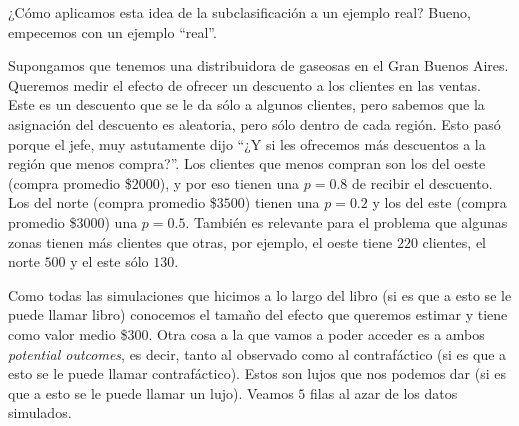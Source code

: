 \documentclass[
  letterpaper,
  DIV=11,
  numbers=noendperiod,
  oneside]{scrreprt}
\begin{document}
¿Cómo aplicamos esta idea de la subclasificación a un ejemplo real?
Bueno, empecemos con un ejemplo ``real''.

Supongamos que tenemos una distribuidora de gaseosas en el Gran Buenos
Aires. Queremos medir el efecto de ofrecer un descuento a los clientes
en las ventas. Este es un descuento que se le da sólo a algunos
clientes, pero sabemos que la asignación del descuento es aleatoria,
pero sólo dentro de cada región. Esto pasó porque el jefe, muy
astutamente dijo ``¿Y si les ofrecemos más descuentos a la región que
menos compra?''. Los clientes que menos compran son los del oeste
(compra promedio \$\(2000\)), y por eso tienen una \(p=0.8\) de recibir
el descuento. Los del norte (compra promedio \$\(3500\)) tienen una
\(p=0.2\) y los del este (compra promedio \$\(3000\)) una \(p=0.5\).
También es relevante para el problema que algunas zonas tienen más
clientes que otras, por ejemplo, el oeste tiene \(220\) clientes, el
norte \(500\) y el este sólo \(130\).

Como todas las simulaciones que hicimos a lo largo del libro (si es que
a esto se le puede llamar libro) conocemos el tamaño del efecto que
queremos estimar y tiene como valor medio \$\(300\). Otra cosa a la que
vamos a poder acceder es a ambos \emph{potential outcomes}, es decir,
tanto al observado como al contrafáctico (si es que a esto se le puede
llamar contrafáctico). Estos son lujos que nos podemos dar (si es que a
esto se le puede llamar un lujo). Veamos \(5\) filas al azar de los
datos simulados.
\end{document}
